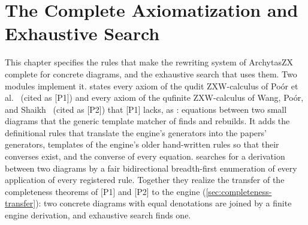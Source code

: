 \chapter{The Complete Axiomatization and Exhaustive Search}\label{ch:completeness}

\providecommand{\cmplr}[1]{\texttt{\detokenize{#1}}}
\providecommand{\cmplempty}{\tikz[baseline=-0.5ex]{\draw[dashed,gray] (0,-0.25) rectangle (0.5,0.25);}}
\providecommand{\cmpleq}[3]{\par\smallskip\noindent\hfil#1\quad$=$\quad\ensuremath{#2}\,#3\hfil\par\smallskip}

This chapter specifies the rules that make the rewriting system of ArchytasZX complete for
concrete diagrams, and the exhaustive search that uses them. Two modules implement it.
 states every axiom of the qudit ZXW-calculus of Po\'or
et al.~\cite{poor2023zxw} (cited as [P1]) and every axiom of the qufinite ZXW-calculus of Wang,
Po\'or, and Shaikh~\cite{wang2023qufinitezxw} (cited as [P2]) that [P1] lacks, as
: equations between two small diagrams that the generic template matcher of
 finds and rebuilds. It adds the definitional rules that
translate the engine's generators into the papers' generators, templates of the engine's older
hand-written rules so that their converses exist, and the converse of every equation.
 searches for a derivation between two diagrams by a fair
bidirectional breadth-first enumeration of every application of every registered rule. Together
they realize the transfer of the completeness theorems of [P1] and [P2] to the engine
(\cref{sec:completeness-transfer}): two concrete diagrams with equal denotations are joined by a
finite engine derivation, and exhaustive search finds one.

